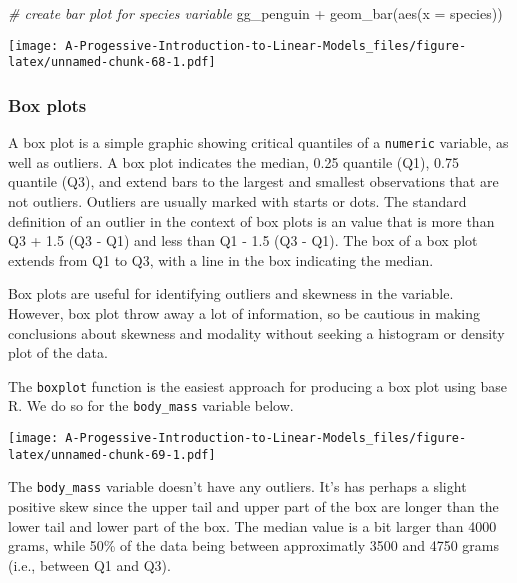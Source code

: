 \documentclass[
]{book}
\newenvironment{Shaded}{\begin{snugshade}}{\end{snugshade}}
\newcommand{\AttributeTok}[1]{\textcolor[rgb]{0.77,0.63,0.00}{#1}}
\newcommand{\CommentTok}[1]{\textcolor[rgb]{0.56,0.35,0.01}{\textit{#1}}}
\newcommand{\FunctionTok}[1]{\textcolor[rgb]{0.00,0.00,0.00}{#1}}
\newcommand{\NormalTok}[1]{#1}
\newcommand{\SpecialCharTok}[1]{\textcolor[rgb]{0.00,0.00,0.00}{#1}}
\newcommand{\StringTok}[1]{\textcolor[rgb]{0.31,0.60,0.02}{#1}}
\theoremstyle{definition}
\theoremstyle{definition}
\theoremstyle{definition}
\theoremstyle{definition}
\theoremstyle{remark}
\begin{document}
\begin{Shaded}
\begin{Highlighting}[]
\CommentTok{\# create bar plot for species variable}
\NormalTok{gg\_penguin }\SpecialCharTok{+} \FunctionTok{geom\_bar}\NormalTok{(}\FunctionTok{aes}\NormalTok{(}\AttributeTok{x =}\NormalTok{ species))}
\end{Highlighting}
\end{Shaded}

\texttt{[image: A-Progessive-Introduction-to-Linear-Models\_files/figure-latex/unnamed-chunk-68-1.pdf]}

\hypertarget{box-plots}{%
\subsubsection{Box plots}\label{box-plots}}

A box plot is a simple graphic showing critical quantiles of a \texttt{numeric} variable, as well as outliers. A box plot indicates the median, 0.25 quantile (Q1), 0.75 quantile (Q3), and extend bars to the largest and smallest observations that are not outliers. Outliers are usually marked with starts or dots. The standard definition of an outlier in the context of box plots is an value that is more than Q3 + 1.5 (Q3 - Q1) and less than Q1 - 1.5 (Q3 - Q1). The box of a box plot extends from Q1 to Q3, with a line in the box indicating the median.

Box plots are useful for identifying outliers and skewness in the variable. However, box plot throw away a lot of information, so be cautious in making conclusions about skewness and modality without seeking a histogram or density plot of the data.

The \texttt{boxplot} function is the easiest approach for producing a box plot using base R. We do so for the \texttt{body\_mass} variable below.

\begin{Shaded}
\end{Shaded}

\texttt{[image: A-Progessive-Introduction-to-Linear-Models\_files/figure-latex/unnamed-chunk-69-1.pdf]}

The \texttt{body\_mass} variable doesn't have any outliers. It's has perhaps a slight positive skew since the upper tail and upper part of the box are longer than the lower tail and lower part of the box. The median value is a bit larger than 4000 grams, while 50\% of the data being between approximatly 3500 and 4750 grams (i.e., between Q1 and Q3).
\end{document}
